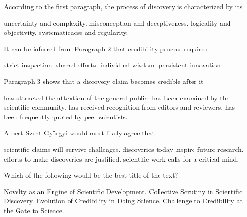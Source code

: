 \item According to the first paragraph, the process of discovery is characterized by its
\begin{tasks}
	\task uncertainty and complexity.
	\task misconception and deceptiveness.
	\task logicality and objectivity.
	\task systematicness and regularity.
\end{tasks}
\item It can be inferred from Paragraph 2 that credibility process requires
\begin{tasks}
	\task strict inspection.
	\task shared efforts.
	\task individual wisdom.
	\task persistent innovation.
\end{tasks}
\item Paragraph 3 shows that a discovery claim becomes credible after it
\begin{tasks}
	\task has attracted the attention of the general public.
	\task has been examined by the scientific community.
	\task has received recognition from editors and reviewers.
	\task has been frequently quoted by peer scientists.
\end{tasks}
\item Albert Szent-Györgyi would most likely agree that
\begin{tasks}
	\task scientific claims will survive challenges.
	\task discoveries today inspire future research.
	\task efforts to make discoveries are justified.
	\task scientific work calls for a critical mind.
\end{tasks}
\item Which of the following would be the best title of the text?
\begin{tasks}
	\task Novelty as an Engine of Scientific Development.
	\task Collective Scrutiny in Scientific Discovery.
	\task Evolution of Credibility in Doing Science.
	\task Challenge to Credibility at the Gate to Science.
\end{tasks}